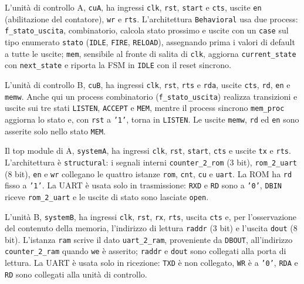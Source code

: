 L'unità di controllo A, \texttt{cuA}, ha ingressi \texttt{clk}, \texttt{rst}, \texttt{start} e \texttt{cts}, uscite \texttt{en} (abilitazione del contatore), \texttt{wr} e \texttt{rts}. L'architettura \texttt{Behavioral} usa due process: \texttt{f\_stato\_uscita}, combinatorio, calcola stato prossimo e uscite con un \texttt{case} sul tipo enumerato \texttt{stato} (\texttt{IDLE}, \texttt{FIRE}, \texttt{RELOAD}), assegnando prima i valori di default a tutte le uscite; \texttt{mem}, sensibile al fronte di salita di \texttt{clk}, aggiorna \texttt{current\_state} con \texttt{next\_state} e riporta la FSM in \texttt{IDLE} con il reset sincrono.


L'unità di controllo B, \texttt{cuB}, ha ingressi \texttt{clk}, \texttt{rst}, \texttt{rts} e \texttt{rda}, uscite \texttt{cts}, \texttt{rd}, \texttt{en} e \texttt{memw}. Anche qui un process combinatorio (\texttt{f\_stato\_uscita}) realizza transizioni e uscite sui tre stati \texttt{LISTEN}, \texttt{ACCEPT} e \texttt{MEM}, mentre il process sincrono \texttt{mem\_proc} aggiorna lo stato e, con \texttt{rst} a \texttt{'1'}, torna in \texttt{LISTEN}. Le uscite \texttt{memw}, \texttt{rd} ed \texttt{en} sono asserite solo nello stato \texttt{MEM}.


Il top module di A, \texttt{systemA}, ha ingressi \texttt{clk}, \texttt{rst}, \texttt{start}, \texttt{cts} e uscite \texttt{tx} e \texttt{rts}. L'architettura è \texttt{structural}: i segnali interni \texttt{counter\_2\_rom} (3 bit), \texttt{rom\_2\_uart} (8 bit), \texttt{en} e \texttt{wr} collegano le quattro istanze \texttt{rom}, \texttt{cnt}, \texttt{cu} e \texttt{uart}. La ROM ha \texttt{rd} fisso a \texttt{'1'}. La UART è usata solo in trasmissione: \texttt{RXD} e \texttt{RD} sono a \texttt{'0'}, \texttt{DBIN} riceve \texttt{rom\_2\_uart} e le uscite di stato sono lasciate \texttt{open}.


L'unità B, \texttt{systemB}, ha ingressi \texttt{clk}, \texttt{rst}, \texttt{rx}, \texttt{rts}, uscita \texttt{cts} e, per l'osservazione del contenuto della memoria, l'indirizzo di lettura \texttt{raddr} (3 bit) e l'uscita \texttt{dout} (8 bit). L'istanza \texttt{ram} scrive il dato \texttt{uart\_2\_ram}, proveniente da \texttt{DBOUT}, all'indirizzo \texttt{counter\_2\_ram} quando \texttt{we} è asserito; \texttt{raddr} e \texttt{dout} sono collegati alla porta di lettura. La UART è usata solo in ricezione: \texttt{TXD} è non collegato, \texttt{WR} è a \texttt{'0'}, \texttt{RDA} e \texttt{RD} sono collegati alla unità di controllo.

